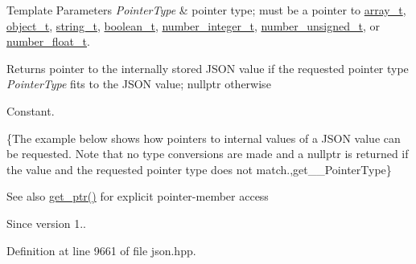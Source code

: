 \begin{DoxyTemplParams}{Template Parameters}
{\em Pointer\+Type} & pointer type; must be a pointer to \hyperlink{classnlohmann_1_1basic__json_a4c409f1b6d9caf3412c78af9a5883fed}{array\+\_\+t}, \hyperlink{classnlohmann_1_1basic__json_a3cdea044cc3ecba1c4f9874a89daf6e4}{object\+\_\+t}, \hyperlink{classnlohmann_1_1basic__json_a61f8566a1a85a424c7266fb531dca005}{string\+\_\+t}, \hyperlink{classnlohmann_1_1basic__json_a4c919102a9b4fe0d588af64801436082}{boolean\+\_\+t}, \hyperlink{classnlohmann_1_1basic__json_a98e611d67b7bd75307de99c9358ab2dc}{number\+\_\+integer\+\_\+t}, \hyperlink{classnlohmann_1_1basic__json_ab906e29b5d83ac162e823ada2156b989}{number\+\_\+unsigned\+\_\+t}, or \hyperlink{classnlohmann_1_1basic__json_a88d6103cb3620410b35200ee8e313d97}{number\+\_\+float\+\_\+t}.\\
\hline
\end{DoxyTemplParams}
\begin{DoxyReturn}{Returns}
pointer to the internally stored J\+S\+ON value if the requested pointer type {\itshape Pointer\+Type} fits to the J\+S\+ON value; {\ttfamily nullptr} otherwise
\end{DoxyReturn}
Constant.

\{The example below shows how pointers to internal values of a J\+S\+ON value can be requested. Note that no type conversions are made and a {\ttfamily nullptr} is returned if the value and the requested pointer type does not match.,get\+\_\+\+\_\+\+Pointer\+Type\}

\begin{DoxySeeAlso}{See also}
\hyperlink{classnlohmann_1_1basic__json_aefa46bd2d96bb77a38d1c8b431eab44f}{get\+\_\+ptr()} for explicit pointer-\/member access
\end{DoxySeeAlso}
\begin{DoxySince}{Since}
version 1.. 
\end{DoxySince}


Definition at line 9661 of file json.\+hpp.

